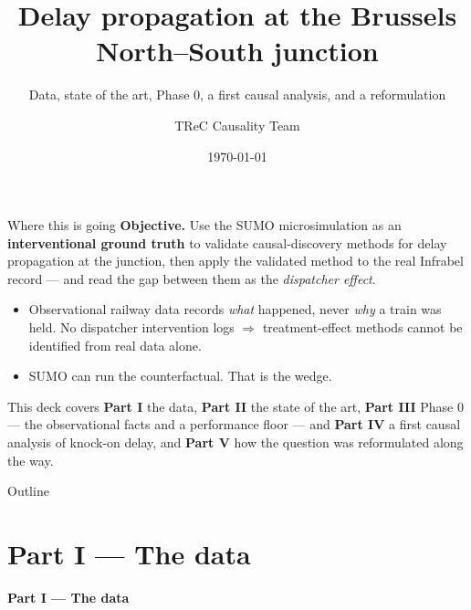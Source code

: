 \documentclass[aspectratio=169,10pt]{beamer}
\title{\textbf{Delay propagation at the Brussels North--South junction}}
\subtitle{Data, state of the art, Phase 0, a first causal analysis, and a reformulation}
\author{TReC Causality Team}
\date{\today}
\newcommand{\hl}[1]{{\color{corange}\textbf{#1}}}
\begin{document}
\begin{frame}[plain]
  \titlepage
\end{frame}

\begin{frame}{Where this is going}
  \textbf{Objective.} Use the SUMO microsimulation as an \hl{interventional ground truth}
  to validate causal-discovery methods for delay propagation at the junction, then apply
  the validated method to the real Infrabel record --- and read the gap between them as
  the \emph{dispatcher effect}.

  \vspace{1em}
  \begin{itemize}
    \item Observational railway data records \emph{what} happened, never \emph{why} a
      train was held. No dispatcher intervention logs $\Rightarrow$ treatment-effect
      methods cannot be identified from real data alone.
    \item SUMO can run the counterfactual. That is the wedge.
  \end{itemize}

  \vspace{1em}
  This deck covers \textbf{Part I} the data, \textbf{Part II} the state of the art,
  \textbf{Part III} Phase 0 --- the observational facts and a performance floor --- and
  \textbf{Part IV} a first causal analysis of knock-on delay, and
  \textbf{Part V} how the question was reformulated along the way.
\end{frame}

\begin{frame}{Outline}
  \tableofcontents
\end{frame}

\section{Part I --- The data}
\begin{frame}[plain]
  \begin{center}\Large\textbf{Part I --- The data}\end{center}
\end{frame}
\end{document}
